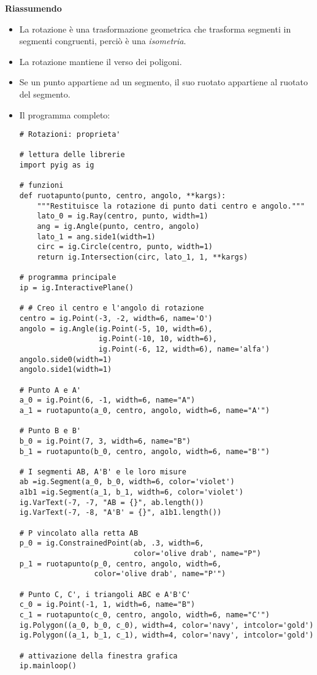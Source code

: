 \textbf{Riassumendo}
\begin{itemize} [noitemsep]
\item La rotazione è una trasformazione geometrica che trasforma segmenti
in segmenti congruenti, perciò è una \emph{isometria}.
\item La rotazione mantiene il verso dei poligoni.
\item Se un punto appartiene ad un segmento, il suo ruotato appartiene al
ruotato del segmento.
\item Il programma completo:

\begin{lstlisting}
# Rotazioni: proprieta'

# lettura delle librerie
import pyig as ig

# funzioni
def ruotapunto(punto, centro, angolo, **kargs):
    """Restituisce la rotazione di punto dati centro e angolo."""
    lato_0 = ig.Ray(centro, punto, width=1)
    ang = ig.Angle(punto, centro, angolo)
    lato_1 = ang.side1(width=1)
    circ = ig.Circle(centro, punto, width=1)
    return ig.Intersection(circ, lato_1, 1, **kargs)
  
# programma principale
ip = ig.InteractivePlane()

# # Creo il centro e l'angolo di rotazione
centro = ig.Point(-3, -2, width=6, name='O')
angolo = ig.Angle(ig.Point(-5, 10, width=6),
                  ig.Point(-10, 10, width=6),
                  ig.Point(-6, 12, width=6), name='alfa')
angolo.side0(width=1)
angolo.side1(width=1)

# Punto A e A'
a_0 = ig.Point(6, -1, width=6, name="A")
a_1 = ruotapunto(a_0, centro, angolo, width=6, name="A'")

# Punto B e B'
b_0 = ig.Point(7, 3, width=6, name="B")
b_1 = ruotapunto(b_0, centro, angolo, width=6, name="B'")

# I segmenti AB, A'B' e le loro misure
ab =ig.Segment(a_0, b_0, width=6, color='violet')
a1b1 =ig.Segment(a_1, b_1, width=6, color='violet')
ig.VarText(-7, -7, "AB = {}", ab.length())
ig.VarText(-7, -8, "A'B' = {}", a1b1.length())

# P vincolato alla retta AB
p_0 = ig.ConstrainedPoint(ab, .3, width=6,
                          color='olive drab', name="P")
p_1 = ruotapunto(p_0, centro, angolo, width=6,
                 color='olive drab', name="P'")

# Punto C, C', i triangoli ABC e A'B'C'
c_0 = ig.Point(-1, 1, width=6, name="B")
c_1 = ruotapunto(c_0, centro, angolo, width=6, name="C'")
ig.Polygon((a_0, b_0, c_0), width=4, color='navy', intcolor='gold')
ig.Polygon((a_1, b_1, c_1), width=4, color='navy', intcolor='gold')

# attivazione della finestra grafica
ip.mainloop()
\end{lstlisting}
\end{itemize}

